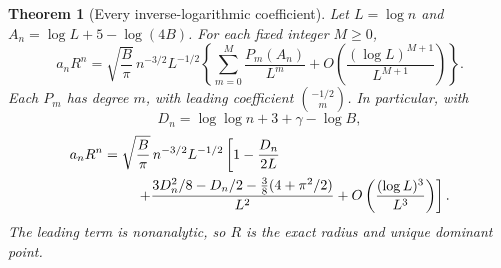 \documentclass[11pt,a4paper]{article}
\newtheorem{theorem}{Theorem}[section]
\theoremstyle{definition}\newtheorem{definition}[theorem]{Definition}
\theoremstyle{remark}\newtheorem{remark}[theorem]{Remark}
\numberwithin{equation}{section}
\begin{document}
\begin{theorem}[Every inverse-logarithmic coefficient]\label{qb:thm:log-all}
Let $L=\log n$ and $A_n=\log L+5-\log(4B)$. For each fixed integer
$M\ge0$,
\begin{equation}\label{qb:eq:all-log}
 a_nR^n=\sqrt{\frac{B}{\pi}}\,n^{-3/2}L^{-1/2}
 \left\{\sum_{m=0}^M\frac{P_m(A_n)}{L^m}
 +O\left(\frac{(\log L)^{M+1}}{L^{M+1}}\right)\right\}.
\end{equation}
Each $P_m$ has degree $m$, with leading coefficient
$\binom{-1/2}{m}$. In particular, with
\begin{equation}\label{qb:eq:D}
 D_n=\log\log n+3+\gamma-\log B,
\end{equation}
\begin{align}\label{qb:eq:log-two}
 a_nR^n={}&\sqrt{\frac{B}{\pi}}\,n^{-3/2}L^{-1/2}
 \left[1-\frac{D_n}{2L}\right.\notag\\
 &\left.\quad+\frac{3D_n^2/8-D_n/2-\frac38(4+\pi^2/2)}{L^2}
 +O\left(\frac{(\log L)^3}{L^3}\right)\right].
\end{align}
The leading term is nonanalytic, so $R$ is the exact radius and unique
dominant point.
\end{theorem}
\end{document}
